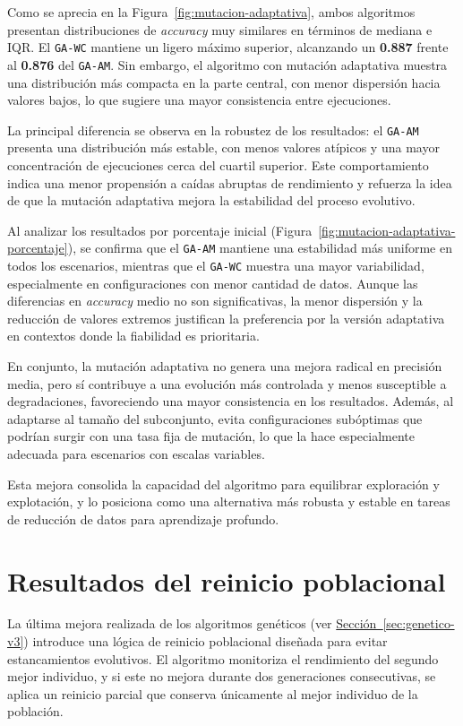 Como se aprecia en la Figura~\ref{fig:mutacion-adaptativa},
ambos algoritmos presentan distribuciones de \textit{accuracy} muy similares en términos de mediana e IQR.
El \texttt{GA-WC} mantiene un ligero máximo superior, alcanzando un \textbf{0.887} frente al \textbf{0.876} del \texttt{GA-AM}.
Sin embargo, el algoritmo con mutación adaptativa muestra una distribución más compacta en la parte central,
con menor dispersión hacia valores bajos, lo que sugiere una mayor consistencia entre ejecuciones.

La principal diferencia se observa en la robustez de los resultados: el \texttt{GA-AM} presenta una distribución más estable,
con menos valores atípicos y una mayor concentración de ejecuciones cerca del cuartil superior.
Este comportamiento indica una menor propensión a caídas abruptas de rendimiento y refuerza la idea de que la mutación
adaptativa mejora la estabilidad del proceso evolutivo.

Al analizar los resultados por porcentaje inicial (Figura~\ref{fig:mutacion-adaptativa-porcentaje}),
se confirma que el \texttt{GA-AM} mantiene una estabilidad más uniforme en todos los escenarios, mientras que el \texttt{GA-WC} muestra una mayor variabilidad,
especialmente en configuraciones con menor cantidad de datos.
Aunque las diferencias en \textit{accuracy} medio no son significativas, la menor dispersión y la reducción de valores extremos justifican la
preferencia por la versión adaptativa en contextos donde la fiabilidad es prioritaria.

En conjunto, la mutación adaptativa no genera una mejora radical en precisión media,
pero sí contribuye a una evolución más controlada y menos susceptible a degradaciones, favoreciendo una mayor consistencia en los resultados.
Además, al adaptarse al tamaño del subconjunto, evita configuraciones subóptimas que podrían surgir con una tasa fija de mutación,
lo que la hace especialmente adecuada para escenarios con escalas variables.

Esta mejora consolida la capacidad del algoritmo para equilibrar exploración y explotación,
y lo posiciona como una alternativa más robusta y estable en tareas de reducción de datos para aprendizaje profundo.


\section{Resultados del reinicio poblacional}\label{sec:resultados-reinicio-poblacional}
La última mejora realizada de los algoritmos genéticos (ver \hyperref[sec:genetico-v3]{Sección~\ref*{sec:genetico-v3}})
introduce una lógica de reinicio poblacional diseñada para evitar estancamientos evolutivos.
El algoritmo monitoriza el rendimiento del segundo mejor individuo, y si este no mejora durante dos generaciones consecutivas,
se aplica un reinicio parcial que conserva únicamente al mejor individuo de la población.

